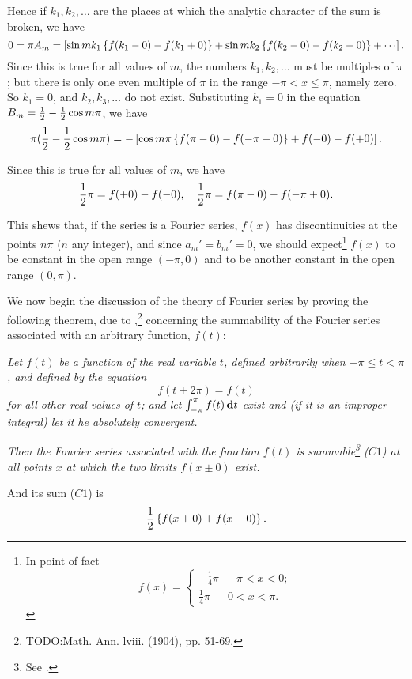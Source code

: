 Hence if $k_{1}, k_{2},\ldots$ are the places at which the analytic
character of the sum is broken, we have
$$
0
=
\pi A_{m}
=
\thebracket{
  \sin m k_{1} \thebrace{
    f(k_{1} - 0) - f(k_{1} + 0)
  }
  +
  \sin m k_{2} \thebrace{
    f(k_{2} - 0) - f(k_{2} + 0)
  }
  +
  \cdots
}.
$$
Since this is true for all values of $m$, the numbers
$k_{1}, k_{2}, \ldots$ must
be multiples of $\pi$; but
there is only one even multiple of $\pi$ in the range
$-\pi < x \leq \pi$, namely zero.
So $k_{1} = 0$,
and $k_{2}, k_{3}, \ldots$ do not exist.
Substituting $k_{1} = 0$ in the equation
$B_{m} = \frac{1}{2} - \frac{1}{2} \cos m \pi$, we have
$$
\pi (\frac{1}{2} - \frac{1}{2} \cos m \pi)
=
- \left[ 
  \cos m \pi \left\{ 
    f(\pi - 0) - f(-\pi + 0)
   \right\}
  + f(-0)
  - f(+0)
 \right].
$$

Since this is true for all values of $m$, we have
$$
\frac{1}{2} \pi = f(+0) - f(-0),
\quad
\frac{1}{2} \pi = f(\pi - 0) - f(-\pi + 0).
$$

This shews that, if the
series is a Fourier series, $f(x)$ has discontinuities at the points
$n \pi$ ($n$ any integer), and since $a_{m}' = b_{m}' = 0$, we should
expect\footnote{In point of fact
  $$
  f(x)
  =
  \begin{cases}
    -\frac{1}{4} \pi & -\pi < x < 0;\\
    \frac{1}{4} \pi & 0 < x < \pi.
  \end{cases}
  $$
} $f(x)$
to be constant in the open range $(-\pi, 0)$ and to be another constant
in the open range $(0, \pi)$.


We now begin the discussion of the theory of Fourier series by proving
the following theorem, due to \Fejer,\footnote{TODO:Math. Ann. lviii. (1904), pp. 51-69.}
concerning the summability of
the Fourier series associated with an arbitrary function, $f(t)$:

\emph{Let $f(t)$ be a function of the real variable $t$, defined arbitrarily
  when $-\pi \leq t < \pi$, and defined by the equation
  $$
  f(t + 2\pi) = f(t)
  $$
%
%
  for all other real values of $t$; and let
  $\int_{-\pi}^{\pi} f(t) \, \mathbf{d} t$
  exist and (if it is an improper integral)
  let it he absolutely convergent.
}

\emph{Then the Fourier series associated with the function
  $f(t)$ is summable\footnote{See .} ($C1$)
  at all points $x$ at which the two limits $f(x \pm 0)$ exist.}

And its sum ($C1$) is
$$
\frac{1}{2} \left\{ 
  f(x + 0) + f(x-0)
 \right\}.
$$

